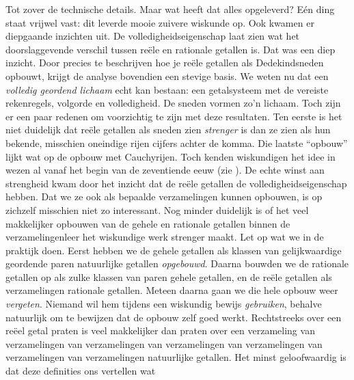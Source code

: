 \documentclass[openany]{memoir}
\begin{document}
Tot zover de technische details. Maar wat heeft dat alles opgeleverd?
Eén ding staat vrijwel vast: dit leverde {mooie} zuivere wiskunde op.
Ook kwamen er diepgaande inzichten uit. De volledigheidseigenschap
laat zien wat het doorslaggevende verschil tussen reële en rationale
getallen is. Dat was een diep inzicht. Door precies te beschrijven hoe je
reële getallen als Dedekindsneden opbouwt, krijgt de analyse bovendien een stevige
basis. We weten nu dat een \emph{volledig geordend lichaam} echt kan
bestaan: een getalsysteem met de vereiste rekenregels, volgorde en
volledigheid. De sneden vormen zo'n lichaam.
Toch zijn er een paar redenen om voorzichtig te zijn met deze resultaten.
Ten eerste is het niet duidelijk dat reële getallen als sneden zien
\emph{strenger} is dan ze zien als hun bekende, misschien oneindige
rijen cijfers achter de komma. Die laatste ``opbouw'' lijkt wat op de
opbouw met Cauchyrijen. Toch kenden wiskundigen het idee in wezen al
vanaf het begin van de zeventiende eeuw (zie ). De
echte winst aan strengheid kwam door het inzicht dat de reële getallen de
volledigheidseigenschap hebben. Dat we ze ook als bepaalde
verzamelingen kunnen opbouwen, is op zichzelf misschien niet zo
interessant.
Nog minder duidelijk is of het veel makkelijker opbouwen van de gehele en
rationale getallen binnen de verzamelingenleer het wiskundige werk strenger maakt. Let op wat we in de
praktijk doen. Eerst hebben we de gehele getallen als klassen van
gelijkwaardige geordende paren natuurlijke getallen
\emph{opgebouwd}. Daarna bouwden we de rationale getallen op als zulke
klassen van paren gehele getallen, en de reële getallen als
verzamelingen rationale getallen. Meteen daarna gaan we die hele opbouw
weer \emph{vergeten}. Niemand wil hem tijdens een wiskundig bewijs
\emph{gebruiken}, behalve natuurlijk om te bewijzen dat de opbouw zelf
goed werkt. Rechtstreeks over een reëel getal praten is veel
makkelijker dan praten over een verzameling van verzamelingen van
verzamelingen van verzamelingen van verzamelingen van verzamelingen van
verzamelingen natuurlijke getallen.
%
%
%
Het minst geloofwaardig is dat deze definities ons vertellen wat
\end{document}
